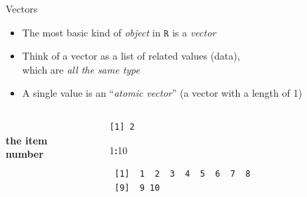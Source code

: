 \documentclass[
  11pt,
  ignorenonframetext,
]{beamer}
\newenvironment{Shaded}{\begin{snugshade}}{\end{snugshade}}
\newcommand{\AlertTok}[1]{\textcolor[rgb]{0.94,0.16,0.16}{#1}}
\newcommand{\DecValTok}[1]{\textcolor[rgb]{0.00,0.00,0.81}{#1}}
\newcommand{\SpecialCharTok}[1]{\textcolor[rgb]{0.81,0.36,0.00}{\textbf{#1}}}
\begin{document}
\begin{frame}[fragile]{Vectors}
\protect\hypertarget{vectors}{}
\begin{itemize}
\item
  The most basic kind of \emph{object} in \(\texttt{R}\) is a
  \emph{vector}
\item
  Think of a vector as a list of related values (data),\\
  which are \emph{all the same type}
\item
  A single value is an ``\emph{atomic vector}'' (a vector with a length
  of 1)
\end{itemize}

\hfill\break

\begin{columns}[c]
\begin{column}{0.25\textwidth}
\centering
\AlertTok{\Large\textbf{\\ the item\\ number}}
\end{column}

\begin{column}{0.5\textwidth}
\hfill{}

\begin{verbatim}
[1] 2
\end{verbatim}

\begin{Shaded}
\begin{Highlighting}[]
\DecValTok{1}\SpecialCharTok{:}\DecValTok{10}
\end{Highlighting}
\end{Shaded}

\begin{verbatim}
 [1]  1  2  3  4  5  6  7  8
 [9]  9 10
\end{verbatim}

\vspace{-\baselineskip}
\end{column}

\begin{column}{0.25\textwidth}
\centering
\AlertTok{\Large\textbf{}}
\end{column}
\end{columns}


\end{frame}
\end{document}
